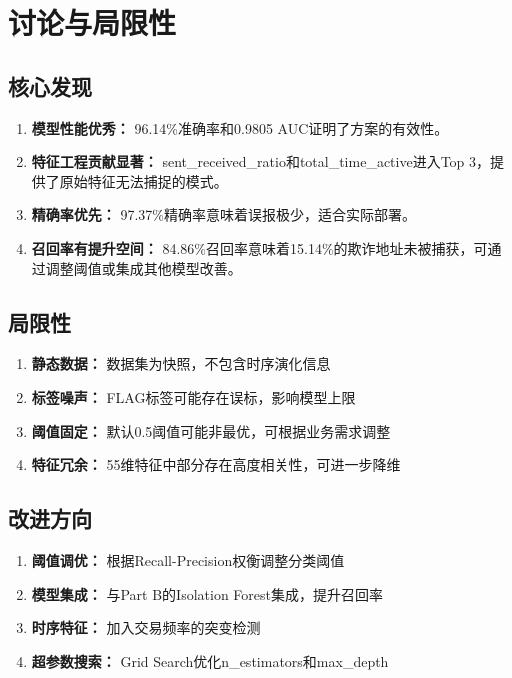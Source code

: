 \documentclass[12pt,a4paper]{article}
\begin{document}
\section{讨论与局限性}

\subsection{核心发现}

\begin{enumerate}
    \item \textbf{模型性能优秀：} 96.14\%准确率和0.9805 AUC证明了方案的有效性。
    \item \textbf{特征工程贡献显著：} sent\_received\_ratio和total\_time\_active进入Top 3，提供了原始特征无法捕捉的模式。
    \item \textbf{精确率优先：} 97.37\%精确率意味着误报极少，适合实际部署。
    \item \textbf{召回率有提升空间：} 84.86\%召回率意味着15.14\%的欺诈地址未被捕获，可通过调整阈值或集成其他模型改善。
\end{enumerate}

\subsection{局限性}

\begin{enumerate}
    \item \textbf{静态数据：} 数据集为快照，不包含时序演化信息
    \item \textbf{标签噪声：} FLAG标签可能存在误标，影响模型上限
    \item \textbf{阈值固定：} 默认0.5阈值可能非最优，可根据业务需求调整
    \item \textbf{特征冗余：} 55维特征中部分存在高度相关性，可进一步降维
\end{enumerate}

\subsection{改进方向}

\begin{enumerate}
    \item \textbf{阈值调优：} 根据Recall-Precision权衡调整分类阈值
    \item \textbf{模型集成：} 与Part B的Isolation Forest集成，提升召回率
    \item \textbf{时序特征：} 加入交易频率的突变检测
    \item \textbf{超参数搜索：} Grid Search优化n\_estimators和max\_depth
\end{enumerate}
\end{document}
